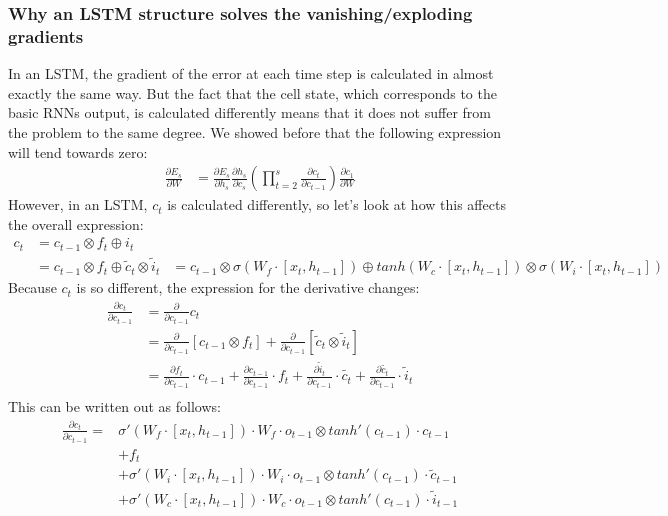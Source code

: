 \subsubsection{Why an LSTM structure solves the vanishing/exploding gradients}
In an LSTM, the gradient of the error at each time step is calculated in almost exactly the same way. But the fact that the cell state, which corresponds to the basic RNNs output, is calculated differently means that it does not suffer from the problem to the same degree. We showed before that the following expression will tend towards zero:
\begin{align}
    \frac{\partial E_s}{\partial W} &= \frac{\partial E_s}{\partial h_s}\frac{\partial h_s}{\partial c_s} \left(\prod_{t=2}^s\frac{\partial c_t}{\partial c_{t-1}} \right) \frac{\partial c_1} {\partial W} 
\end{align}
However, in an LSTM, $c_t$ is calculated differently, so let's look at how this affects the overall expression:
\begin{align}
    c_t &= c_{t-1} \otimes f_t \oplus i_t \\
    &=  c_{t-1} \otimes f_t \oplus \tilde{c}_t \otimes \tilde{i}_t
    &= c_{t-1} \otimes \sigma (W_f \cdot [x_t,h_{t-1}]) \oplus tanh(W_c \cdot [x_t,h_{t-1}]) \otimes \sigma (W_i \cdot [x_t,h_{t-1}])
\end{align}
Because $c_t$ is so different, the expression for the derivative changes:
\begin{align}
    \frac{\partial c_t}{\partial c_{t-1}} &= \frac{\partial}{\partial c_{t-1}} c_t \\
    &= \frac{\partial}{\partial c_{t-1}} \left[c_{t-1} \otimes f_t \right] + \frac{\partial}{\partial c_{t-1}} \left[\tilde{c}_t \otimes \tilde{i}_t \right] \\
    &= \frac{\partial f_t}{\partial c_{t-1}} \cdot c_{t-1} + \frac{\partial c_{t-1}}{\partial c_{t-1}} \cdot f_t + \frac{\partial \tilde{i}_t}{\partial c_{t-1}} \cdot \tilde{c_t} + \frac{\partial \tilde{c_t}}{\partial c_{t-1}} \cdot \tilde{i}_t \\
\end{align}
This can be written out as follows:
\begin{align}
    \frac{\partial c_t}{\partial c_{t-1}} =& \sigma'(W_f \cdot [x_t,h_{t-1}]) \cdot W_f \cdot o_{t-1} \otimes tanh'(c_{t-1}) \cdot c_{t-1} \\
    &+ f_t \\
    &+ \sigma'(W_i \cdot [x_t,h_{t-1}]) \cdot W_i \cdot o_{t-1} \otimes tanh'(c_{t-1}) \cdot \tilde{c}_{t-1} \\
    &+ \sigma'(W_c \cdot [x_t,h_{t-1}]) \cdot W_c \cdot o_{t-1} \otimes tanh'(c_{t-1}) \cdot \tilde{i}_{t-1}
\end{align}
